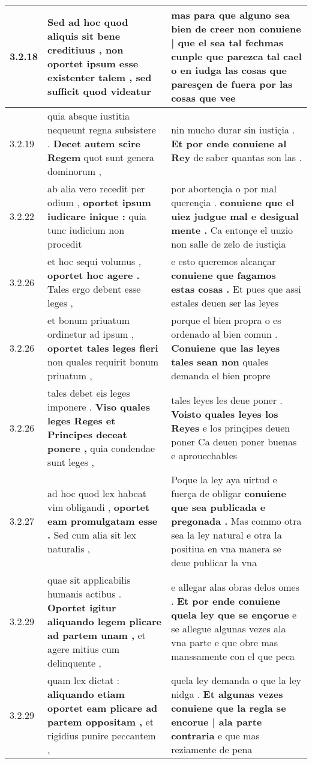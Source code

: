 \begin{tabular}{|p{1cm}|p{6.5cm}|p{6.5cm}|}
3.2.18 & Sed ad hoc quod aliquis sit bene creditiuus , \textbf{ non oportet ipsum esse existenter talem , } sed sufficit quod videatur & mas para que alguno sea bien de creer \textbf{ non conuiene | que el sea tal fechmas cunple } que parezca tal cael o en iudga las cosas que paresçen de fuera por las cosas que vee \\\hline
3.2.19 & quia absque iustitia nequeunt regna subsistere . \textbf{ Decet autem scire Regem } quot sunt genera dominorum , & nin mucho durar sin iustiçia . \textbf{ Et por ende conuiene al Rey } de saber quantas son las . \\\hline
3.2.22 & ab alia vero recedit per odium , \textbf{ oportet ipsum iudicare inique : } quia tunc iudicium non procedit & por abortençia o por mal querençia . \textbf{ conuiene que el uiez judgue mal e desigual mente . } Ca entonçe el uuzio non salle de zelo de iustiçia \\\hline
3.2.26 & et hoc sequi volumus , \textbf{ oportet hoc agere . } Tales ergo debent esse leges , & e esto queremos alcançar \textbf{ conuiene que fagamos estas cosas . } Et pues que assi estales deuen ser las leyes \\\hline
3.2.26 & et bonum priuatum ordinetur ad ipsum , \textbf{ oportet tales leges fieri } non quales requirit bonum priuatum , & porque el bien propra o es ordenado al bien comun . \textbf{ Conuiene que las leyes tales sean non } quales demanda el bien propre \\\hline
3.2.26 & tales debet eis leges imponere . \textbf{ Viso quales leges Reges et Principes deceat ponere , } quia condendae sunt leges , & tales leyes les deue poner . \textbf{ Voisto quales leyes los Reyes } e los prinçipes deuen poner Ca deuen poner buenas e aprouechables \\\hline
3.2.27 & ad hoc quod lex habeat vim obligandi , \textbf{ oportet eam promulgatam esse . } Sed cum alia sit lex naturalis , & Poque la ley aya uirtud e fuerça de obligar \textbf{ conuiene que sea publicada e pregonada . } Mas commo otra sea la ley natural e otra la positiua en vna manera se deue publicar la vna \\\hline
3.2.29 & quae sit applicabilis humanis actibus . \textbf{ Oportet igitur aliquando legem plicare ad partem unam , } et agere mitius cum delinquente , & e allegar alas obras delos omes . \textbf{ Et por ende conuiene quela ley que se ençorue } e se allegue algunas vezes ala vna parte e que obre mas manssamente con el que peca \\\hline
3.2.29 & quam lex dictat : \textbf{ aliquando etiam oportet eam plicare ad partem oppositam , } et rigidius punire peccantem , & quela ley demanda o que la ley nidga . \textbf{ Et algunas vezes conuiene que la regla se encorue | ala parte contraria } e que mas reziamente de pena \\\hline

\end{tabular}
